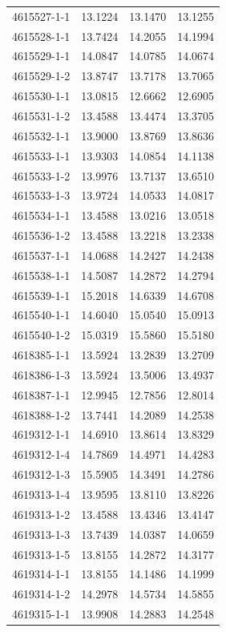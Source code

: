 \begin{longtable}{lrrr}
4615527-1-1 & 13.1224 & 13.1470 & 13.1255 \\
4615528-1-1 & 13.7424 & 14.2055 & 14.1994 \\
4615529-1-1 & 14.0847 & 14.0785 & 14.0674 \\
4615529-1-2 & 13.8747 & 13.7178 & 13.7065 \\
4615530-1-1 & 13.0815 & 12.6662 & 12.6905 \\
4615531-1-2 & 13.4588 & 13.4474 & 13.3705 \\
4615532-1-1 & 13.9000 & 13.8769 & 13.8636 \\
4615533-1-1 & 13.9303 & 14.0854 & 14.1138 \\
4615533-1-2 & 13.9976 & 13.7137 & 13.6510 \\
4615533-1-3 & 13.9724 & 14.0533 & 14.0817 \\
4615534-1-1 & 13.4588 & 13.0216 & 13.0518 \\
4615536-1-2 & 13.4588 & 13.2218 & 13.2338 \\
4615537-1-1 & 14.0688 & 14.2427 & 14.2438 \\
4615538-1-1 & 14.5087 & 14.2872 & 14.2794 \\
4615539-1-1 & 15.2018 & 14.6339 & 14.6708 \\
4615540-1-1 & 14.6040 & 15.0540 & 15.0913 \\
4615540-1-2 & 15.0319 & 15.5860 & 15.5180 \\
4618385-1-1 & 13.5924 & 13.2839 & 13.2709 \\
4618386-1-3 & 13.5924 & 13.5006 & 13.4937 \\
4618387-1-1 & 12.9945 & 12.7856 & 12.8014 \\
4618388-1-2 & 13.7441 & 14.2089 & 14.2538 \\
4619312-1-1 & 14.6910 & 13.8614 & 13.8329 \\
4619312-1-4 & 14.7869 & 14.4971 & 14.4283 \\
4619312-1-3 & 15.5905 & 14.3491 & 14.2786 \\
4619313-1-4 & 13.9595 & 13.8110 & 13.8226 \\
4619313-1-2 & 13.4588 & 13.4346 & 13.4147 \\
4619313-1-3 & 13.7439 & 14.0387 & 14.0659 \\
4619313-1-5 & 13.8155 & 14.2872 & 14.3177 \\
4619314-1-1 & 13.8155 & 14.1486 & 14.1999 \\
4619314-1-2 & 14.2978 & 14.5734 & 14.5855 \\
4619315-1-1 & 13.9908 & 14.2883 & 14.2548 \\

\end{longtable}
